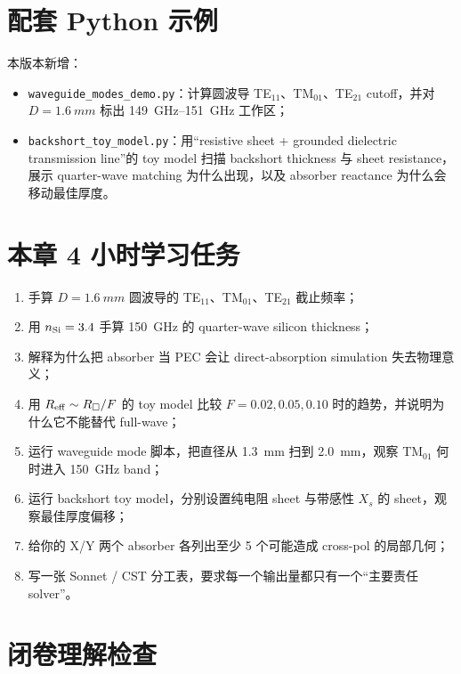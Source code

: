 \documentclass[11pt,a4paper,openany]{ctexrep}
\begin{document}
\section{配套 Python 示例}

本版本新增：
\begin{itemize}
  \item \texttt{waveguide\_modes\_demo.py}：计算圆波导 TE$_{11}$、TM$_{01}$、TE$_{21}$ cutoff，并对 $D=\SI{1.6}{mm}$ 标出 \SIrange{149}{151}{GHz} 工作区；
  \item \texttt{backshort\_toy\_model.py}：用“resistive sheet + grounded dielectric transmission line”的 toy model 扫描 backshort thickness 与 sheet resistance，展示 quarter-wave matching 为什么出现，以及 absorber reactance 为什么会移动最佳厚度。
\end{itemize}

\section{本章 4 小时学习任务}

\begin{enumerate}
  \item 手算 $D=\SI{1.6}{mm}$ 圆波导的 TE$_{11}$、TM$_{01}$、TE$_{21}$ 截止频率；
  \item 用 $n_{\rm Si}=3.4$ 手算 \SI{150}{GHz} 的 quarter-wave silicon thickness；
  \item 解释为什么把 absorber 当 PEC 会让 direct-absorption simulation 失去物理意义；
  \item 用 $R_{\rm eff}\sim R_\square/F$ 的 toy model 比较 $F=0.02,0.05,0.10$ 时的趋势，并说明为什么它不能替代 full-wave；
  \item 运行 waveguide mode 脚本，把直径从 \SI{1.3}{mm} 扫到 \SI{2.0}{mm}，观察 TM$_{01}$ 何时进入 \SI{150}{GHz} band；
  \item 运行 backshort toy model，分别设置纯电阻 sheet 与带感性 $X_s$ 的 sheet，观察最佳厚度偏移；
  \item 给你的 X/Y 两个 absorber 各列出至少 5 个可能造成 cross-pol 的局部几何；
  \item 写一张 Sonnet / CST 分工表，要求每一个输出量都只有一个“主要责任 solver”。
\end{enumerate}

\section{闭卷理解检查}
\end{document}
